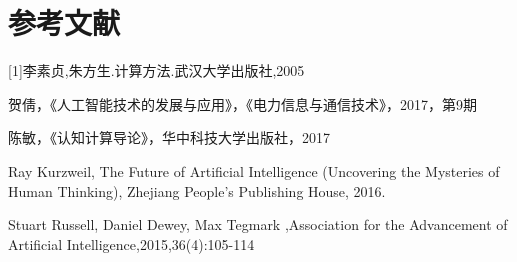\documentclass{article}
\begin{document}
\section{参考文献}


[1]\quad 李素贞,朱方生.计算方法.武汉大学出版社,2005\par
[2]\quad 贺倩，《人工智能技术的发展与应用》，《电力信息与通信技术》，2017，第9期\par
[3]\quad 陈敏，《认知计算导论》，华中科技大学出版社，2017\par
[4]\quad Ray Kurzweil, The Future of Artificial Intelligence (Uncovering the Mysteries of Human Thinking), Zhejiang People's Publishing House, 2016.\par
[5]\quad Stuart Russell, Daniel Dewey, Max Tegmark ,Association for the Advancement of Artificial Intelligence,2015,36(4):105-114






				


%

%

\end{document}
